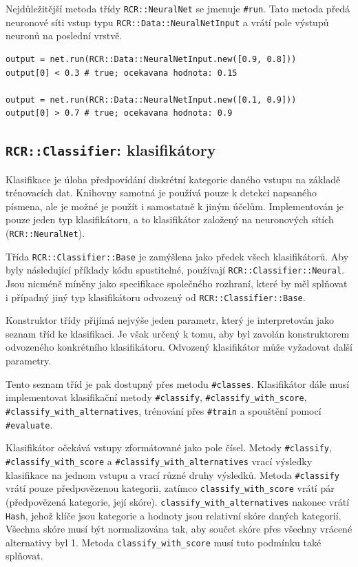 \documentclass[a4paper]{article}
\begin{document}
Nejdůležitější metoda třídy \texttt{RCR::NeuralNet} se jmenuje \texttt{\#run}.
Tato metoda předá neuronové síti vstup typu \texttt{RCR::Data::NeuralNetInput} a
vrátí pole výstupů neuronů na poslední vrstvě.
\begin{lstlisting}
output = net.run(RCR::Data::NeuralNetInput.new([0.9, 0.8]))
output[0] < 0.3 # true; ocekavana hodnota: 0.15

output = net.run(RCR::Data::NeuralNetInput.new([0.1, 0.9]))
output[0] > 0.7 # true; ocekavana hodnota: 0.9
\end{lstlisting}

\subsection{\texttt{RCR::Classifier}: klasifikátory}

Klasifikace je úloha předpovídání diskrétní kategorie daného vstupu na základě
trénovacích dat. Knihovny samotná je používá pouze k detekci napsaného písmena,
ale je možné je použít i samostatně k jiným účelům. Implementován je pouze jeden
typ klasifikátoru, a to klasifikátor založený na neuronových sítích
(\texttt{RCR::NeuralNet}).

Třída \texttt{RCR::Classifier::Base} je zamýšlena jako předek všech
klasifikátorů. Aby byly následující příklady
kódu spustitelné, používají \texttt{RCR::Classifier::Neural}. Jsou nicméně
míněny jako specifikace společného rozhraní, které by měl splňovat i případný
jiný typ klasifikátoru odvozený od \texttt{RCR::Classifier::Base}.

Konstruktor třídy přijímá nejvýše jeden parametr, který je
interpretován jako seznam tříd ke klasifikaci. Je však určený k tomu,
aby byl zavolán konstruktorem odvozeného konkrétního klasifikátoru.
Odvozený klasifikátor může vyžadovat další parametry.

Tento seznam tříd je pak dostupný přes metodu \texttt{\#classes}.
Klasifikátor dále musí implementovat klasifikační metody \texttt{\#classify},
\texttt{\#classify\_with\_score}, \texttt{\#classify\_with\_alternatives},
trénování přes \texttt{\#train} a spouštění pomocí \texttt{\#evaluate}.

Klasifikátor očekává vstupy zformátované jako pole čísel.
Metody \texttt{\#classify}, \texttt{\#classify\_with\_score} a
\texttt{\#classify\_with\_alternatives} vrací výsledky klasifikace
na jednom vstupu a vrací různé druhy výsledků. Metoda \texttt{\#classify}
vrátí pouze předpovězenou kategorii, zatímco \texttt{classify\_with\_score}
vrátí pár (předpovězená kategorie, její skóre).
\texttt{classify\_with\_alternatives} nakonec vrátí \texttt{Hash}, jehož
klíče jsou kategorie a hodnoty jsou relativní skóre daných kategorií.
Všechna skóre musí být normalizována tak, aby součet skóre přes všechny
vrácené alternativy byl 1. Metoda \texttt{classify\_with\_score} musí
tuto podmínku také splňovat.
\end{document}
